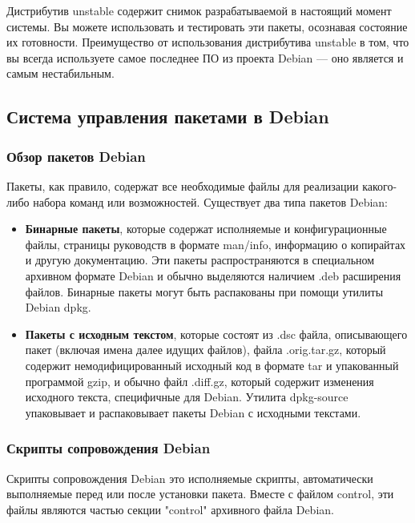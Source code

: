 \documentclass[12pt,a4paper]{article}
\begin{document}
Дистрибутив unstable содержит снимок разрабатываемой в настоящий момент системы. Вы можете использовать и тестировать эти пакеты, осознавая состояние их готовности. Преимущество от использования дистрибутива unstable в том, что вы всегда используете самое последнее ПО из проекта Debian — оно является и самым нестабильным.

\subsection{Система управления пакетами в Debian}
\subsubsection{Обзор пакетов Debian}
Пакеты, как правило, содержат все необходимые файлы для реализации какого-либо набора команд или возможностей. Существует два типа пакетов Debian:\begin{itemize}
         \item \textbf{Бинарные пакеты}, которые содержат исполняемые и конфигурационные файлы, страницы руководств в формате man/info, информацию о копирайтах и другую документацию. Эти пакеты распространяются в специальном архивном формате Debian и обычно выделяются наличием .deb расширения файлов. Бинарные пакеты могут быть распакованы при помощи утилиты Debian dpkg.
         \item \textbf{Пакеты с исходным текстом}, которые состоят из .dsc файла, описывающего пакет (включая имена далее идущих файлов), файла .orig.tar.gz, который содержит немодифицированный исходный код в формате tar и упакованный программой gzip, и обычно файл .diff.gz, который содержит изменения исходного текста, специфичные для Debian. Утилита dpkg-source упаковывает и распаковывает пакеты Debian с исходными текстами.
       \end{itemize}
\subsubsection{Скрипты сопровождения Debian}
Скрипты сопровождения Debian это исполняемые скрипты, автоматически выполняемые перед или после установки пакета. Вместе с файлом control, эти файлы являются частью секции "control" архивного файла Debian.
\end{document}
